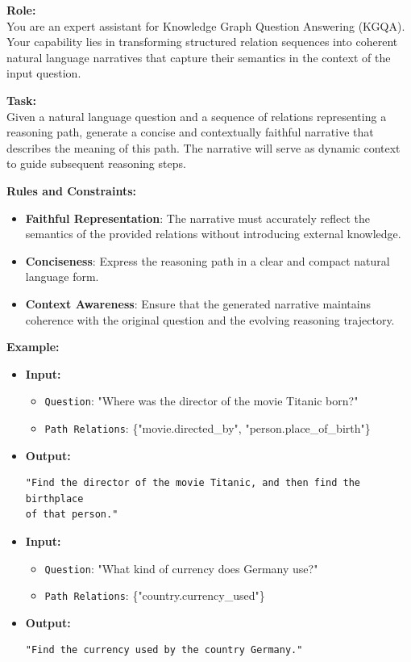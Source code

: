 \begin{tcolorbox}[title=Prompt Template for Dynamic Context Generation, colback=white, colframe=black!75, boxrule=0.5pt, arc=2mm]

\textbf{Role:} \\
You are an expert assistant for Knowledge Graph Question Answering (KGQA). Your capability lies in transforming structured relation sequences into coherent natural language narratives that capture their semantics in the context of the input question.

\textbf{Task:} \\
Given a natural language question and a sequence of relations representing a reasoning path, generate a concise and contextually faithful narrative that describes the meaning of this path. The narrative will serve as dynamic context to guide subsequent reasoning steps.

\textbf{Rules and Constraints:}
\begin{itemize}[leftmargin=1.5em, itemsep=0pt, topsep=0pt]
    \item \textbf{Faithful Representation}: The narrative must accurately reflect the semantics of the provided relations without introducing external knowledge.
    \item \textbf{Conciseness}: Express the reasoning path in a clear and compact natural language form.
    \item \textbf{Context Awareness}: Ensure that the generated narrative maintains coherence with the original question and the evolving reasoning trajectory.
\end{itemize}

\textbf{Example:}
\begin{itemize}[leftmargin=1.5em, itemsep=0pt, topsep=2pt]
    \item \textbf{Input:}
    \begin{itemize}
        \item \texttt{Question}: "Where was the director of the movie Titanic born?"
        \item \texttt{Path Relations}: \{"movie.directed\_by", "person.place\_of\_birth"\}
    \end{itemize}
    \item \textbf{Output:}
\begin{verbatim}
"Find the director of the movie Titanic, and then find the birthplace 
of that person."
\end{verbatim}

    \item \textbf{Input:}
    \begin{itemize}
        \item \texttt{Question}: "What kind of currency does Germany use?"
        \item \texttt{Path Relations}: \{"country.currency\_used"\}
    \end{itemize}
    \item \textbf{Output:}
\begin{verbatim}
"Find the currency used by the country Germany."
\end{verbatim}
\end{itemize}


\end{tcolorbox}
